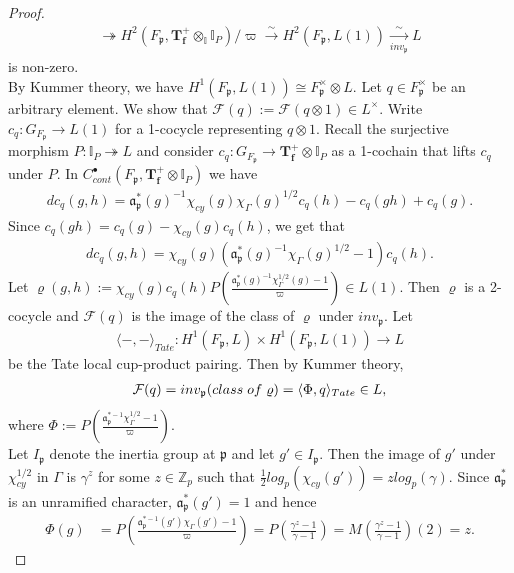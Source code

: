 \documentclass[reqno,10pt]{amsart}
\newcommand{\zp}{\mathbb{Z}_{p}}
\newcommand{\I}{\mathbb{I}}
\newcommand{\f}{\mathbf{f}}
\newcommand{\T}{\mathbf{T}}
\newcommand{\ma}{\mathfrak{a}}
\newcommand{\p}{\mathfrak{p}}
\newcommand{\vp}{\varpi}
\theoremstyle{plain}
\theoremstyle{definition}
\begin{document}
\begin{proof}
\begin{align*}
        \twoheadrightarrow H^2(F_\p,\T_\f^+ \otimes_\I \I_P)/\vp \xrightarrow{\sim} H^2(F_\p,L(1)) \xrightarrow[inv_\p]{\sim} L
    \end{align*}
    is non-zero.
    \\
    By Kummer theory, we have $H^1(F_\p,L(1)) \cong F_\p^\times \otimes L$. Let $q \in F_\p^\times$ be an arbitrary element. We show that $\mathcal{F}(q) := \mathcal{F}(q \otimes 1) \in L^\times$. Write $c_q : G_{F_\p} \rightarrow L(1)$ for a 1-cocycle representing $q \otimes 1$. Recall the surjective morphism $P : \I_P \twoheadrightarrow L$ and consider $c_q : G_{F_\p} \rightarrow \T_\f^+ \otimes \I_P$ as a 1-cochain that lifts $c_q$ under $P$. In $C^\bullet_{cont}(F_\p,\T_\f^+ \otimes \I_P)$ we have
    \begin{align*}
        d c_q(g,h) = \ma_\p^*(g)^{-1}\chi_{cy}(g)\chi_\Gamma(g)^{1/2}c_q(h) - c_q(gh) + c_q(g).
    \end{align*}
    Since $c_q(gh) = c_q(g) - \chi_{cy}(g)c_q(h)$, we get that 
    \begin{align*}
        d c_q(g,h) = \chi_{cy}(g)(\ma_\p^*(g)^{-1}\chi_\Gamma(g)^{1/2} - 1)c_q(h).
    \end{align*}
    Let $\varrho(g,h) := \chi_{cy}(g)c_q(h)P \left(\frac{\ma_\p^*(g)^{-1}\chi_\Gamma^{1/2}(g) - 1}{\vp} \right) \in L(1)$. Then $\varrho$ is a 2-cocycle and $\mathcal{F}(q)$ is the image of the class of $\varrho$ under $inv_\p$. Let
    \begin{align*}
        \langle -,- \rangle_{Tate} : H^1(F_\p,L) \times H^1(F_\p,L(1)) \rightarrow L
    \end{align*}
    be the Tate local cup-product pairing. Then by Kummer theory, 
    \begin{align*}
        \mathcal{F}(q) = inv_\p(class \hspace{1mm} of \hspace{1mm} \varrho) = \langle \Phi,q \rangle_{Tate} \in L, 
    \end{align*}
    where $\Phi := P \left(\frac{\ma_\p^{*-1}\chi_\Gamma^{1/2} - 1}{\vp} \right)$.
    \\
    Let $I_\p$ denote the inertia group at $\p$ and let $g' \in I_\p$. Then the image of $g'$ under $\chi_{cy}^{1/2}$ in $\Gamma$ is $\gamma^z$ for some $z \in \zp$ such that $\frac{1}{2} log_p(\chi_{cy}(g')) = z log_p(\gamma)$. Since $\ma_\p^*$ is an unramified character, $\ma_\p^*(g') = 1$ and hence
    \begin{align*}
        \Phi(g) & = P \left(\frac{\ma_\p^{*-1}(g')\chi_\Gamma(g') - 1}{\vp} \right) = P \left(\frac{\gamma^z - 1}{\gamma - 1} \right) = M \left(\frac{\gamma^z - 1}{\gamma - 1} \right)(2) = z.

\end{align*}
\end{proof}
\end{document}
